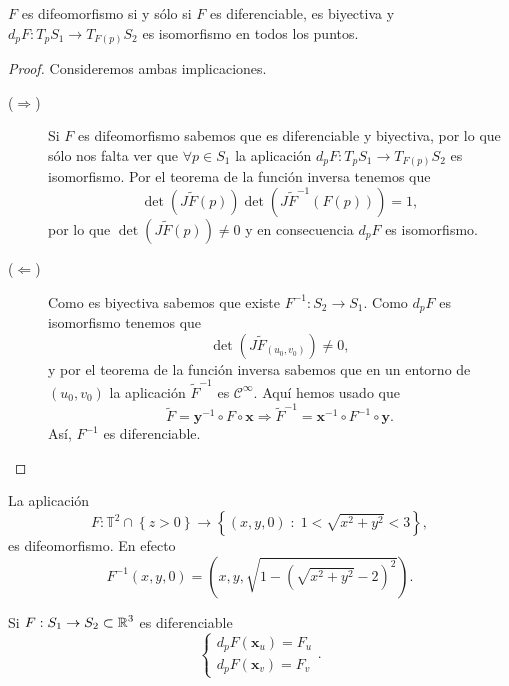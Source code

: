 \begin{prop}
$\displaystyle F $ es difeomorfismo si y sólo si $\displaystyle F $ es diferenciable, es biyectiva y $\displaystyle d _{p}F : T_{p}S_{1} \to T_{F\left(p\right)}S_{2}$ es isomorfismo en todos los puntos. 
\end{prop}
\begin{proof}
Consideremos ambas implicaciones. 
\begin{description}
	\item[($\displaystyle \Rightarrow $)] Si $\displaystyle F $ es difeomorfismo sabemos que es diferenciable y biyectiva, por lo que sólo nos falta ver que $\displaystyle \forall p \in S_{1} $ la aplicación $\displaystyle d _{p}F : T_{p}S_{1}\to T_{F\left(p\right)}S_{2} $ es isomorfismo.
		Por el teorema de la función inversa tenemos que 
		\[\det\left(J\tilde{F}\left(p\right)\right) \det\left(J\tilde{F}^{-1}\left(F\left(p\right)\right)\right)=1 ,\]
		por lo que $\displaystyle \det\left(J\tilde{F}\left(p\right)\right)\neq 0 $ y en consecuencia $\displaystyle d _{p}F $ es isomorfismo. 
\item[($\displaystyle \Leftarrow $)] Como es biyectiva sabemos que existe $\displaystyle F^{-1} : S_{2} \to S_{1} $. Como $\displaystyle d _{p}F $ es isomorfismo tenemos que 
	\[\det\left(J\tilde{F}_{\left(u_{0}, v_{0}\right)}\right)\neq 0 ,\]
	y por el teorema de la función inversa sabemos que en un entorno de $\displaystyle \left(u_{0}, v_{0}\right) $ la aplicación $\displaystyle \tilde{F}^{-1} $ es $\displaystyle \mathcal{C}^{\infty} $. Aquí hemos usado que 
	\[\tilde{F} = \textbf{y} ^{-1}\circ F \circ \textbf{x} \Rightarrow \tilde{F}^{-1} = \textbf{x} ^{-1}\circ F^{-1} \circ \textbf{y}  .\]
	Así, $\displaystyle F^{-1} $ es diferenciable.
\end{description}
\end{proof}
\begin{eg}
La aplicación
\[ F : \mathbb{T}^{2} \cap \left\{ z > 0\right\} \to \left\{ \left(x,y,0\right) \; : \; 1 < \sqrt{x^{2} +y^{2}} < 3\right\}  ,\]
es difeomorfismo. En efecto
\[F^{-1}\left(x,y,0\right)=\left(x,y,\sqrt{1-\left(\sqrt{x^{2}+y^{2}}-2\right)^{2}}\right) .\]
\end{eg}
\begin{colorary}
Si $\displaystyle F : S_{1}\to S_{2}\subset \mathbb{R}^{3} $ es diferenciable
\[
\begin{cases}
d _{p}F\left( \textbf{x} _{u}\right) = F_{u} \\
d _{p}F\left( \textbf{x} _{v}\right) = F_{v}
\end{cases}
.\]
\end{colorary}
